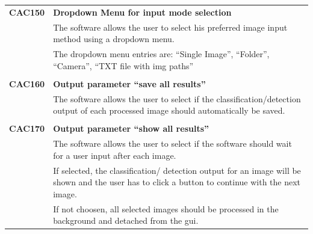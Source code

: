\documentclass[parskip=full]{scrartcl}
\begin{document}
\newpage
\begin{tabular}{p{2cm}p{11.4cm}}
\textbf{CAC150} & \textbf{Dropdown Menu for input mode selection}\\
& The software allows the user to select his preferred image input method using a dropdown menu.\\
& The dropdown menu entries are: ``Single Image'', ``Folder'', ``Camera'', ``TXT file with img paths''\\
& \\
\textbf{CAC160} & \textbf{Output parameter ``save all results''}\\
& The software allows the user to select if the classification/detection output of each processed image should automatically be saved.\\
& \\
\textbf{CAC170} & \textbf{Output parameter ``show all results''}\\
& The software allows the user to select if the software should wait for a user input after each image.\\
& If selected, the classification/ detection output for an image will be shown and the user has to click a button to continue with the next image.\\
& If not choosen, all selected images should be processed in the background and detached from the gui.\\
\end{tabular}
\end{document}
